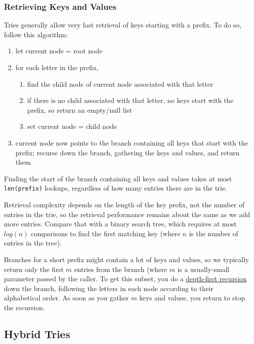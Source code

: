 \documentclass[12pt]{article}
\begin{document}
	\subsubsection*{Retrieving Keys and Values}
	
	Tries generally allow very fast retrieval of keys starting with a prefix. To do so, follow this algorithm:
	\begin{enumerate}[itemsep=0mm]
		\item let current node = root node
		\item for each letter in the prefix,
		\begin{enumerate}
			\item find the child node of current node associated with that letter
			\item if there is no child associated with that letter, no keys start with the prefix, so return an empty/null list
			\item set current node = child node
		\end{enumerate}
		\item current node now points to the branch containing all keys that start with the prefix; recurse down the branch, gathering the keys and values, and return them
	\end{enumerate}

	Finding the start of the branch containing all keys and values takes at most \texttt{len(prefix)} lookups, regardless of how many entries there are in the trie. 
	
	Retrieval complexity depends on the length of the key prefix, not the number of entries in the trie, so the retrieval performance remains about the same as we add more entries. Compare that with a binary search tree, which requires at most $log(n)$ comparisons to find the first matching key (where $n$ is the number of entries in the tree).
	
	Branches for a short prefix might contain a lot of keys and values, so we typically return only the first $m$ entries from the branch (where $m$ is a usually-small parameter passed by the caller. To get this subset, you do a \ul{depth-first recursion} down the branch, following the letters in each node according to their alphabetical order. As soon as you gather $m$ keys and values, you return to stop the recursion.
	
	\subsection*{Hybrid Tries}
	
\end{document}
